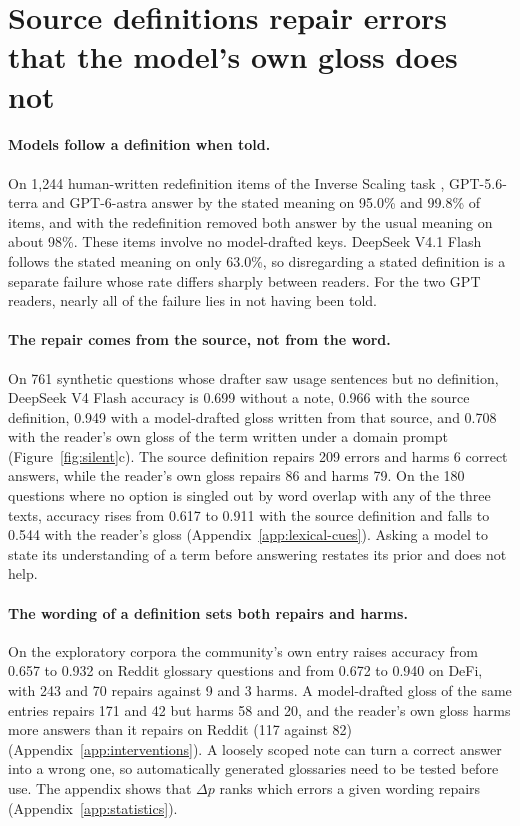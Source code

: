 \section{Source definitions repair errors that the model's own gloss does not}
\label{sec:repair}
\paragraph{Models follow a definition when told.}
On 1,244 human-written redefinition items of the Inverse Scaling task \citep{inverse-scaling}, GPT-5.6-terra and GPT-6-astra answer by the stated meaning on 95.0\% and 99.8\% of items, and with the redefinition removed both answer by the usual meaning on about 98\%. These items involve no model-drafted keys. DeepSeek V4.1 Flash follows the stated meaning on only 63.0\%, so disregarding a stated definition is a separate failure whose rate differs sharply between readers. For the two GPT readers, nearly all of the failure lies in not having been told.

\paragraph{The repair comes from the source, not from the word.}
On 761 synthetic questions whose drafter saw usage sentences but no definition, DeepSeek V4 Flash accuracy is 0.699 without a note, 0.966 with the source definition, 0.949 with a model-drafted gloss written from that source, and 0.708 with the reader's own gloss of the term written under a domain prompt (Figure~\ref{fig:silent}c). The source definition repairs 209 errors and harms 6 correct answers, while the reader's own gloss repairs 86 and harms 79. On the 180 questions where no option is singled out by word overlap with any of the three texts, accuracy rises from 0.617 to 0.911 with the source definition and falls to 0.544 with the reader's gloss (Appendix~\ref{app:lexical-cues}). Asking a model to state its understanding of a term before answering restates its prior and does not help.

\paragraph{The wording of a definition sets both repairs and harms.}
On the exploratory corpora the community's own entry raises accuracy from 0.657 to 0.932 on Reddit glossary questions and from 0.672 to 0.940 on DeFi, with 243 and 70 repairs against 9 and 3 harms. A model-drafted gloss of the same entries repairs 171 and 42 but harms 58 and 20, and the reader's own gloss harms more answers than it repairs on Reddit (117 against 82) (Appendix~\ref{app:interventions}). A loosely scoped note can turn a correct answer into a wrong one, so automatically generated glossaries need to be tested before use. The appendix shows that $\Delta p$ ranks which errors a given wording repairs (Appendix~\ref{app:statistics}).

